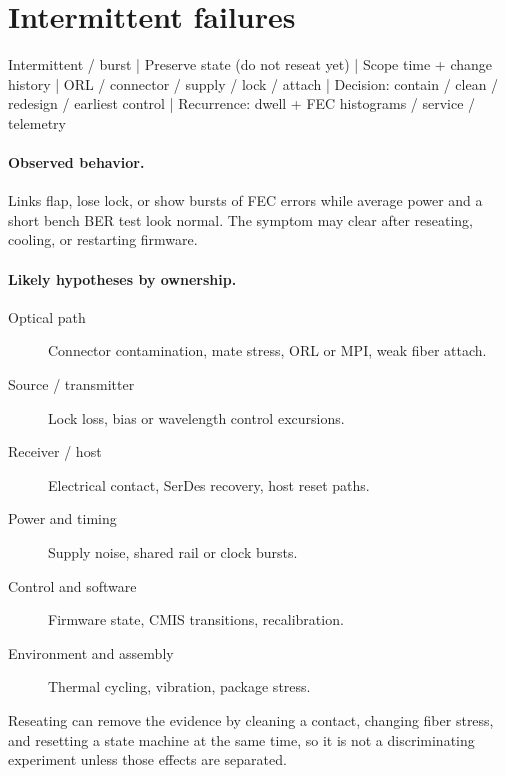 \section{Intermittent failures}
\label{sec:fm-intermittent}

\begin{dectree}
Intermittent / burst
  |
Preserve state (do not reseat yet)
  |
Scope time + change history
  |
ORL / connector / supply / lock / attach
  |
Decision: contain / clean / redesign / earliest control
  |
Recurrence: dwell + FEC histograms / service / telemetry
\end{dectree}


\paragraph{Observed behavior.}
Links flap, lose lock, or show bursts of FEC errors while average power and a
short bench BER test look normal. The symptom may clear after reseating, cooling,
or restarting firmware.


\paragraph{Likely hypotheses by ownership.}
\begin{description}
\item[Optical path] Connector contamination, mate stress, ORL or MPI, weak fiber
      attach.
\item[Source / transmitter] Lock loss, bias or wavelength control excursions.
\item[Receiver / host] Electrical contact, SerDes recovery, host reset paths.
\item[Power and timing] Supply noise, shared rail or clock bursts.
\item[Control and software] Firmware state, CMIS transitions, recalibration.
\item[Environment and assembly] Thermal cycling, vibration, package stress.
\end{description}
Reseating can remove the evidence by cleaning a contact, changing fiber stress,
and resetting a state machine at the same time, so it is not a discriminating
experiment unless those effects are separated.

